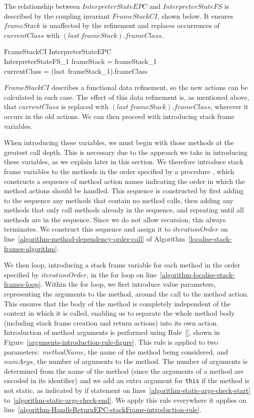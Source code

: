 The relationship between $InterpreterStateEPC$ and
$InterpreterStateFS$ is described by the coupling invariant
$FrameStackCI$, shown below.
It ensures $frameStack$ is unaffected by the refinement and replaces
occurrences of $currentClass$ with $(last~frameStack).frameClass$.
\begin{schema}{FrameStackCI}
  InterpreterStateEPC \\
  InterpreterStateFS_1
\where
  frameStack = frameStack_1 \\
  currentClass = (last~frameStack_1).frameClass
\end{schema}

$FrameStackCI$ describes a functional data refinement, so the new
actions can be calculated in each case.
The effect of this data refinement is, as mentioned above, that
$currentClass$ is replaced with $(last~frameStack).frameClass$,
wherever it occurs in the old actions.
We can then proceed with introducing stack frame variables.

When introducing these variables, we must begin with those methods at
the greatest call depth.
This is necessary due to the approach we take in introducing these
variables, as we explain later in this section.
We therefore introduce stack frame variables to the methods in the
order specified by a procedure , which
constructs a sequence of method action names indicating the order in
which the method actions should be handled.
This sequence is constructed by first adding to the sequence any
methods that contain no method calls, then adding any methods that
only call methods already in the sequence, and repeating until all
methods are in the sequence.
Since we do not allow recursion, this always terminates.
We construct this sequence and assign it to $iterationOrder$ on
line~\ref{algorithm-method-dependency-order-call} of
Algorithm~\ref{localise-stack-frames-algorithm}.

We then loop, introducing a stack frame variable for each method in
the order specified by $iterationOrder$, in the for loop on
line~\ref{algorithm-localise-stack-frames-loop}.
Within the for loop, we first introduce value parameters, representing
the arguments to the method, around the call to the method action.
This ensures that the body of the method is completely independent of
the context in which it is called, enabling us to separate the whole
method body (including stack frame creation and return actions) into
its own action.
Introduction of method arguments is performed using
Rule~[], shown in
Figure~\ref{arguments-introduction-rule-figure}.
This rule is applied to two parameters:~$methodName$, the name of the
method being considered, and $numArgs$, the number of arguments to the
method.
The number of arguments is determined from the name of the method
(since the arguments of a method are encoded in its identifier) and we
add an extra argument for \texttt{this} if the method is not static,
as indicated by if statement on
lines~\ref{algorithm-static-args-check-start}
to~\ref{algorithm-static-args-check-end}.
We apply this rule everywhere it applies on
line~\ref{algorithm-HandleReturnEPC-stackFrame-introduction-rule}.

